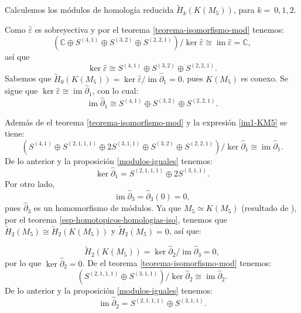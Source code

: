 \documentclass[12pt]{book}
\theoremstyle{definition}
\DeclareMathOperator{\im}{im}
\newcounter{in}
\begin{document}
Calculemos los módulos de homología reducida $\widetilde
H_{k}(K(M_{5}))$, para $k=~0,1,2$.

Como $\widehat\varepsilon$ es sobreyectiva y por el teorema \ref{teorema-isomorfismo-mod} tenemos:
\begin{equation*}
  (\mathbb{C}\oplus S^{(4,1)}\oplus S^{(3,2)}\oplus
  S^{(2,2,1)})/\ker\widehat\varepsilon\cong \im \widehat\varepsilon=\mathbb{C},
\end{equation*}
así que
\begin{equation*}
  \label{ker0-KM5}
  \ker\widehat\varepsilon\cong S^{(4,1)} \oplus S^{(3,2)}\oplus S^{(2,2,1)}.
\end{equation*}
Sabemos que $\widetilde H_{0}(K(M_{5}))=\ker \widehat\varepsilon/\im
\widehat\partial_{1}=0$, pues $K(M_{5})$ es conexo. Se sigue que $\ker \widehat\varepsilon\cong
\im\widehat\partial_{1}$, con lo cual:
\begin{equation}
  \label{im1-KM5}
  \im \widehat\partial_{1}\cong S^{(4,1)} \oplus S^{(3,2)}\oplus S^{(2,2,1)}.
\end{equation}

Además de el teorema \ref{teorema-isomorfismo-mod} y la expresión \ref{im1-KM5} se tiene:
$$(S^{(4,1)}\oplus S^{(2,1,1,1)}\oplus 2S^{(3,1,1)}\oplus S^{(3,2)}
\oplus S^{(2,2,1)})/\ker \widehat\partial_{1}\cong \im \widehat\partial_{1}.$$
De lo anterior y la proposición \ref{modulos-iguales} tenemos:
\begin{equation}
  \label{ker1-KM5}
  \ker \widehat\partial_{1}=S^{(2,1,1,1)}\oplus 2S^{(3,1,1)}.
\end{equation}
Por otro lado,
\begin{equation*}
  \im\widehat\partial_{3}=\widehat\partial_{3}(0)=0,
  \label{im3-KM5}
\end{equation*}
pues $\widehat\partial_{3}$ es un homomorfismo de módulos. Ya que
$M_{5}\simeq K(M_{5})$ (resultado de \cite{larrion2009clique}), por el teorema
\ref{esp-homotopicos-homologias-iso}, tenemos que $\widetilde
H_{2}(M_{5})\cong\widetilde H_{2}(K(M_{5}))$ y  $\widetilde H_{2}(M_{5})=0$, así que:

\begin{equation*}
\widetilde H_{2}(K(M_{5}))=\ker \widehat\partial_{2}/\im \widehat\partial_{3}=0,
\end{equation*}
por lo que $\ker \widehat\partial_{2}=0$. De el teorema
\ref{teorema-isomorfismo-mod} tenemos:
$$(S^{(2,1,1,1)}\oplus S^{(3,1,1)})/\ker \widehat\partial_{2}\cong \im
\widehat\partial_{2}.$$
De lo anterior y la proposición \ref{modulos-iguales} tenemos:
\begin{equation}
  \im \widehat\partial_{2}=S^{(2,1,1,1)}\oplus S^{(3,1,1)}.
  \label{im2-KM5}
\end{equation}
\end{document}
